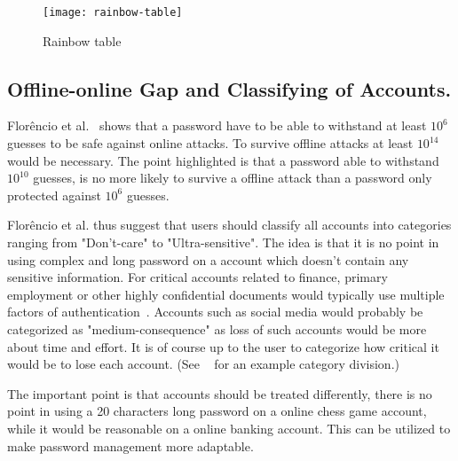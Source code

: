 \begin{figure}[h]
    \texttt{[image: rainbow-table]}
    \caption{Rainbow table}
    \label{rainbow-table}
\end{figure}


\subsection{Offline-online Gap and Classifying of Accounts.}\label{classification} Florêncio et al.~\cite{guide-pws} shows that a password have to be able to withstand at least $10^6$ guesses to be safe against online attacks. To survive offline attacks at least $10^{14}$ would be necessary. The point highlighted is that a password able to withstand $10^{10}$ guesses, is no more likely to survive a offline attack than a password only protected against $10^6$ guesses. 
\par Florêncio et al. thus suggest that users should classify all accounts into categories ranging from "Don't-care" to "Ultra-sensitive". The idea is that it is no point in using complex and long password on a account which doesn't contain any sensitive information. For critical accounts related to finance, primary employment or other highly confidential documents would typically use multiple factors of authentication~\cite{2-factor-auth}. Accounts such as social media would probably be categorized as "medium-consequence" as loss of such accounts would be more about time and effort. It is of course up to the user to categorize how critical it would be to lose each account. (See ~\cite{guide-pws} for an example category division.)
\par The important point is that accounts should be treated differently, there is no point in using a 20 characters long password on a online chess game account, while it would be reasonable on a online banking account. This can be utilized to make password management more adaptable. 




